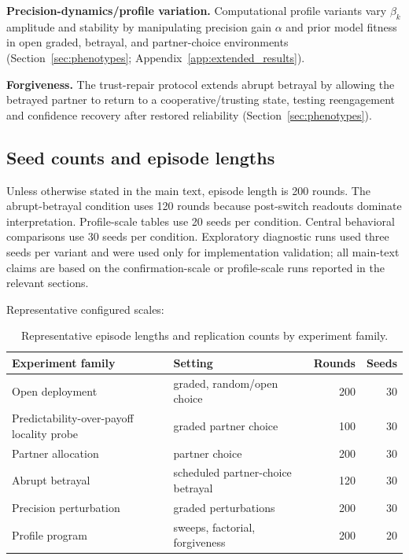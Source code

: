 \textbf{Precision-dynamics/profile variation.} Computational profile variants vary $\beta_k$ amplitude and stability by manipulating precision gain $\alpha$ and prior model fitness in open graded, betrayal, and partner-choice environments (Section~\ref{sec:phenotypes}; Appendix~\ref{app:extended_results}).

\textbf{Forgiveness.} The trust-repair protocol extends abrupt betrayal by allowing the betrayed partner to return to a cooperative/trusting state, testing reengagement and confidence recovery after restored reliability (Section~\ref{sec:phenotypes}).

\subsection{Seed counts and episode lengths}

Unless otherwise stated in the main text, episode length is 200 rounds. The abrupt-betrayal condition uses 120 rounds because post-switch readouts dominate interpretation. Profile-scale tables use 20 seeds per condition. Central behavioral comparisons use 30 seeds per condition. Exploratory diagnostic runs used three seeds per variant and were used only for implementation validation; all main-text claims are based on the confirmation-scale or profile-scale runs reported in the relevant sections.

Representative configured scales:

\begin{table}[H]
\centering
\caption{Representative episode lengths and replication counts by experiment family.}
\label{tab:protocol_scales}
\begin{tabular}{llrr}
\toprule
Experiment family & Setting & Rounds & Seeds \\
\midrule
Open deployment & graded, random/open choice & 200 & 30 \\
Predictability-over-payoff locality probe & graded partner choice & 100 & 30 \\
Partner allocation & partner choice & 200 & 30 \\
Abrupt betrayal & scheduled partner-choice betrayal & 120 & 30 \\
Precision perturbation & graded perturbations & 200 & 30 \\
Profile program & sweeps, factorial, forgiveness & 200 & 20 \\
\bottomrule
\end{tabular}
\end{table}

